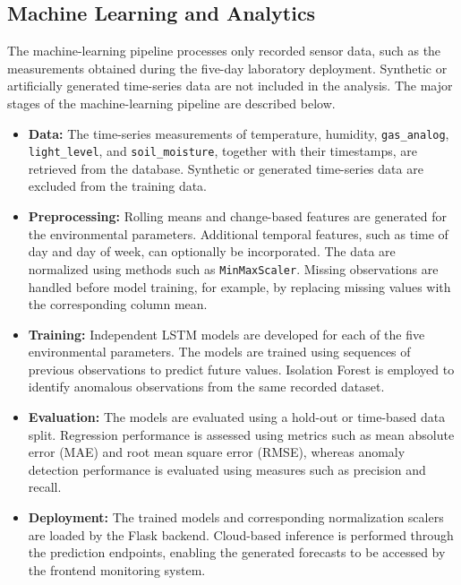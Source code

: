 ﻿\documentclass[journal]{IEEEtran}
\begin{document}
\subsection{Machine Learning and Analytics}

The machine-learning pipeline processes only recorded sensor data, such as
the measurements obtained during the five-day laboratory deployment.
Synthetic or artificially generated time-series data are not included in
the analysis. The major stages of the machine-learning pipeline are
described below.

\begin{itemize}

    \item \textbf{Data:} The time-series measurements of temperature,
    humidity, \texttt{gas\_analog}, \texttt{light\_level}, and
    \texttt{soil\_moisture}, together with their timestamps, are retrieved
    from the database. Synthetic or generated time-series data are excluded
    from the training data.

    \item \textbf{Preprocessing:} Rolling means and change-based features
    are generated for the environmental parameters. Additional temporal
    features, such as time of day and day of week, can optionally be
    incorporated. The data are normalized using methods such as
    \texttt{MinMaxScaler}. Missing observations are handled before model
    training, for example, by replacing missing values with the corresponding
    column mean.

    \item \textbf{Training:} Independent LSTM models are developed for each
    of the five environmental parameters. The models are trained using
    sequences of previous observations to predict future values.
    Isolation Forest is employed to identify anomalous observations from
    the same recorded dataset.

    \item \textbf{Evaluation:} The models are evaluated using a hold-out or
    time-based data split. Regression performance is assessed using metrics
    such as mean absolute error (MAE) and root mean square error (RMSE),
    whereas anomaly detection performance is evaluated using measures such
    as precision and recall.

    \item \textbf{Deployment:} The trained models and corresponding
    normalization scalers are loaded by the Flask backend. Cloud-based
    inference is performed through the prediction endpoints, enabling the
    generated forecasts to be accessed by the frontend monitoring system.

\end{itemize}
\end{document}
